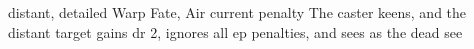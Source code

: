   {distant, detailed}%
  {Warp}%
  {Fate, Air}%
  {current  penalty}%
  {The caster keens, and the distant target gains \gls{dr} 2, ignores all \gls{ep} penalties, and sees as the dead see}%
  {}

